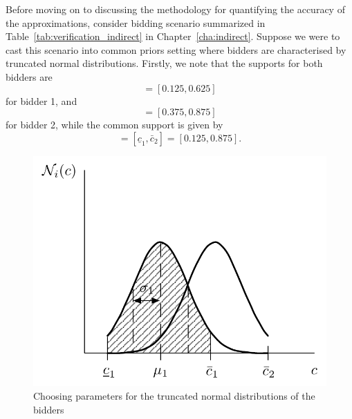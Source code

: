 Before moving on to discussing the methodology for quantifying the accuracy of the approximations, consider bidding scenario summarized in Table~\ref{tab:verification_indirect} in Chapter~\ref{cha:indirect}. Suppose we were to cast this scenario into common priors setting where bidders are characterised by truncated normal distributions. Firstly, we note that the supports for both bidders are
\begin{equation*}
  [\underline{c}_1, \bar{c}_1] = [0.125, 0.625]
\end{equation*}
for bidder 1, and
\begin{equation*}
  [\underline{c}_2, \bar{c}_2] = [0.375, 0.875]
\end{equation*}
for bidder 2, while the common support is given by
\begin{equation*}
  [a,b] = [\underline{c}_1, \bar{c}_2] = [0.125, 0.875].
\end{equation*}

\begin{figure}[t]
  \includegraphics[width=\figsize]{Approximation/Figures/modelling_params}
  \caption{Choosing parameters for the truncated normal distributions of the bidders}
  \label{fig:modelling_params_approximation}
\end{figure}

